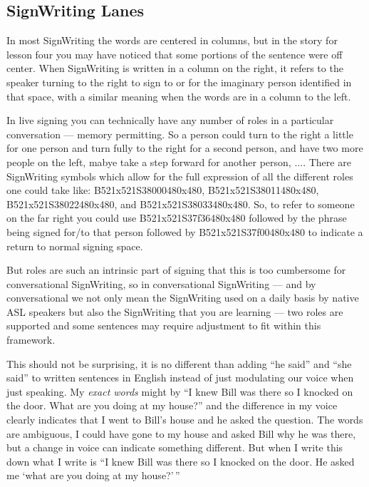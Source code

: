 \documentclass{article}
\begin{document}
\subsection{SignWriting Lanes}

In most SignWriting the words are centered in columns, but in the story for lesson four you may have noticed that some portions of the sentence were off center.
When SignWriting is written in a column on the right, it refers to the speaker turning to the right to sign to or for the imaginary person identified in that space, with a similar meaning when the words are in a column to the left.

In live signing you can technically have any number of roles in a particular conversation --- memory permitting.
So a person could turn to the right a little for one person and turn fully to the right for a second person, and have two more people on the left, mabye take a step forward for another person, $\ldots$.
There are SignWriting symbols which allow for the full expression of all the different roles one could take like: B521x521S38000480x480, B521x521S38011480x480, B521x521S38022480x480, and B521x521S38033480x480.
So, to refer to someone on the far right you could use B521x521S37f36480x480 followed by the phrase being signed for/to that person followed by B521x521S37f00480x480 to indicate a return to normal signing space.

But roles are such an intrinsic part of signing that this is too cumbersome for conversational SignWriting, so in conversational SignWriting ---
and by conversational we not only mean the SignWriting used on a daily basis by native ASL speakers but also the SignWriting that you are learning ---
two roles are supported and some sentences may require adjustment to fit within this framework.

This should not be surprising, it is no different than adding ``he said'' and ``she said'' to written sentences in English instead of just modulating our voice when just speaking.
My \emph{exact words} might by ``I knew Bill was there so I knocked on the door. What are you doing at my house?'' and the difference in my voice clearly indicates that I went to Bill's house and he asked the question.
The words are ambiguous, I could have gone to my house and asked Bill why he was there, but a change in voice can indicate something different.
But when I write this down what I write is ``I knew Bill was there so I knocked on the door. He asked me `what are you doing at my house?'\,''
\end{document}
